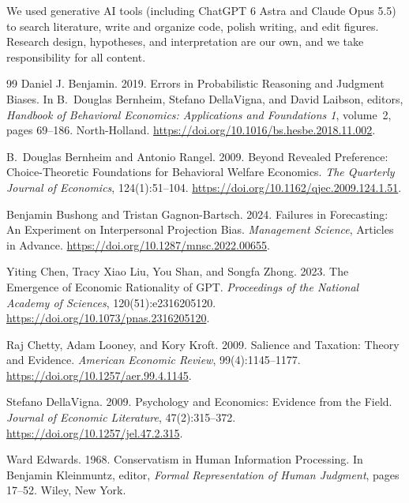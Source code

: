 \documentclass[11pt]{article}
\makeatletter
\renewcommand\paragraph{\@startsection{paragraph}{4}{\z@}{1.2ex \@plus .4ex \@minus .2ex}{-1em}{\normalfont\normalsize\bfseries}}
\makeatother
\begin{document}
\paragraph{Use of AI tools.} We used generative AI tools (including ChatGPT 6 Astra and Claude Opus 5.5) to search literature, write and organize code, polish writing, and edit figures. Research design, hypotheses, and interpretation are our own, and we take responsibility for all content.

{\small
\begin{thebibliography}{99}
Daniel J. Benjamin. 2019.
Errors in Probabilistic Reasoning and Judgment Biases.
In B.~Douglas Bernheim, Stefano DellaVigna, and David Laibson, editors, \emph{Handbook of Behavioral Economics: Applications and Foundations 1}, volume~2, pages 69--186. North-Holland.
\url{https://doi.org/10.1016/bs.hesbe.2018.11.002}.

 B.~Douglas Bernheim and Antonio Rangel. 2009. Beyond Revealed Preference: Choice-Theoretic Foundations for Behavioral Welfare Economics. \emph{The Quarterly Journal of Economics}, 124(1):51--104. \url{https://doi.org/10.1162/qjec.2009.124.1.51}.

 Benjamin Bushong and Tristan Gagnon-Bartsch. 2024. Failures in Forecasting: An Experiment on Interpersonal Projection Bias. \emph{Management Science}, Articles in Advance. \url{https://doi.org/10.1287/mnsc.2022.00655}.

Yiting Chen, Tracy Xiao Liu, You Shan, and Songfa Zhong. 2023.
The Emergence of Economic Rationality of GPT.
\emph{Proceedings of the National Academy of Sciences}, 120(51):e2316205120.
\url{https://doi.org/10.1073/pnas.2316205120}.

Raj Chetty, Adam Looney, and Kory Kroft. 2009.
Salience and Taxation: Theory and Evidence.
\emph{American Economic Review}, 99(4):1145--1177.
\url{https://doi.org/10.1257/aer.99.4.1145}.

Stefano DellaVigna. 2009.
Psychology and Economics: Evidence from the Field.
\emph{Journal of Economic Literature}, 47(2):315--372.
\url{https://doi.org/10.1257/jel.47.2.315}.

Ward Edwards. 1968.
Conservatism in Human Information Processing.
In Benjamin Kleinmuntz, editor, \emph{Formal Representation of Human Judgment}, pages 17--52. Wiley, New York.


\end{thebibliography}}
\end{document}
